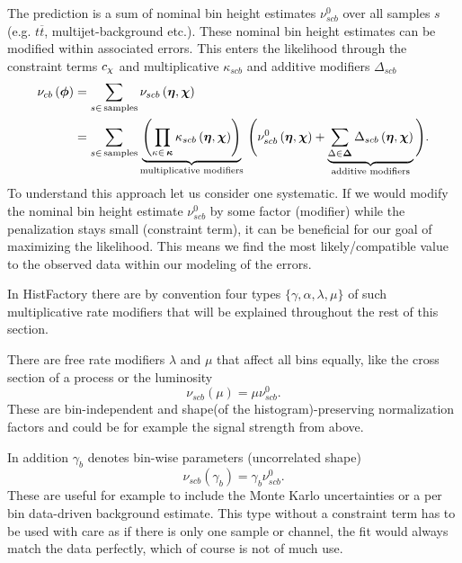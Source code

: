 The prediction is a sum of nominal bin height estimates $\nu_{scb}^0$ over all samples $s$ (e.g. $t\overline{t}$, multijet-background etc.). These nominal bin height estimates can be modified within associated errors. This enters the likelihood through the constraint terms $c_{\chi}$ and multiplicative $\kappa_{scb}$ and additive modifiers $\Delta_{scb}$
\begin{align}
    \nu_{cb}\left(\bm{\phi}\right) &= \sum_{s\in\mathrm{\,samples}} \nu_{scb}\left(\bm{\eta},\bm{\chi}\right)\\ &= \sum_{s\in\mathrm{\,samples}}\underbrace{\left(\prod_{\kappa\in\,\bm{\kappa}} \kappa_{scb}\left(\bm{\eta},\bm{\chi}\right)\right)}_{\text{multiplicative modifiers}}\, \Bigg(\nu_{scb}^0\left(\bm{\eta}, \bm{\chi}\right) + \underbrace{\sum_{\Delta\in\bm{\Delta}} \Delta_{scb}\left(\bm{\eta},\bm{\chi}\right)}_{\text{additive modifiers}}\Bigg).
\end{align}
To understand this approach let us consider one systematic. If we would modify the nominal bin height estimate $\nu_{scb}^0$ by some factor (modifier) while the penalization stays small (constraint term), it can be beneficial for our goal of maximizing the likelihood. This means we find the most likely/compatible value to the observed data within our modeling of the errors. 

In HistFactory there are by convention four types $\{ \gamma,\alpha,\lambda,\mu \}$ of such multiplicative rate modifiers that will be explained throughout the rest of this section. 

There are free rate modifiers $\lambda$ and $\mu$ that affect all bins equally, like the cross section of a process or the luminosity 
\begin{equation}
    \nu_{scb}(\mu)=\mu \nu_{scb}^0.
\end{equation}
These are bin-independent and shape(of the histogram)-preserving normalization factors and could be for example the signal strength from above.

In addition $\gamma_b$ denotes bin-wise parameters (uncorrelated shape)
\begin{equation}
    \nu_{scb}(\gamma_b)=\gamma_b \nu_{scb}^0.
\end{equation}
These are useful for example to include the Monte Karlo uncertainties or a per bin data-driven background estimate. This type without a constraint term has to be used with care as if there is only one sample or channel, the fit would always match the data perfectly, which of course is not of much use.

